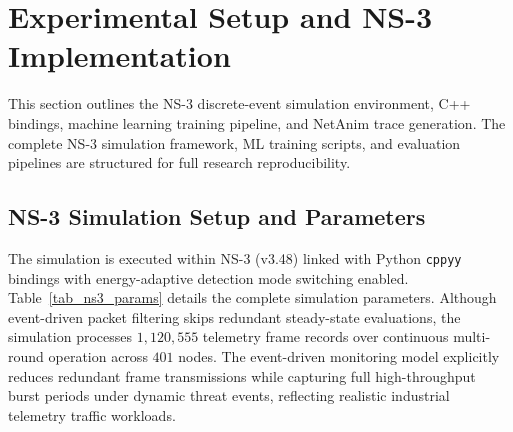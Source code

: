 \documentclass[journal]{IEEEtran}
\begin{document}
\section{Experimental Setup and NS-3 Implementation}
\label{sec_experimental_setup}

This section outlines the NS-3 discrete-event simulation environment, C++ bindings, machine learning training pipeline, and NetAnim trace generation. The complete NS-3 simulation framework, ML training scripts, and evaluation pipelines are structured for full research reproducibility.

\subsection{NS-3 Simulation Setup and Parameters}
The simulation is executed within NS-3 (v3.48) linked with Python \texttt{cppyy} bindings with energy-adaptive detection mode switching enabled. Table~\ref{tab_ns3_params} details the complete simulation parameters. Although event-driven packet filtering skips redundant steady-state evaluations, the simulation processes $1,120,555$ telemetry frame records over continuous multi-round operation across $401$ nodes. The event-driven monitoring model explicitly reduces redundant frame transmissions while capturing full high-throughput burst periods under dynamic threat events, reflecting realistic industrial telemetry traffic workloads.
\end{document}
